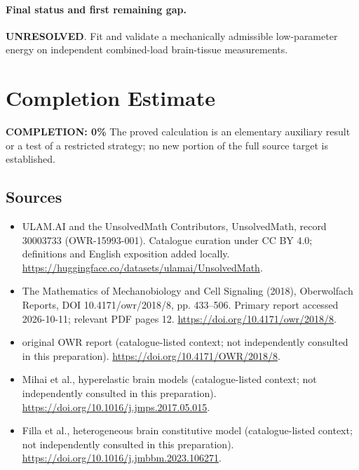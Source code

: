 \documentclass[11pt]{article}
\begin{document}
\paragraph{Final status and first remaining gap.}
\textbf{UNRESOLVED}. Fit and validate a mechanically admissible low-parameter energy on independent combined-load brain-tissue measurements.

\section{Completion Estimate}
\noindent\textbf{COMPLETION: 0\%}
The proved calculation is an elementary auxiliary result or a test of a restricted strategy; no new portion of the full source target is established.

\subsection{Sources}
\begin{itemize}
\item[\hypertarget{source:30003733:1}{S1}] ULAM.AI and the UnsolvedMath Contributors, UnsolvedMath, record 30003733 (OWR-15993-001). Catalogue curation under CC BY 4.0; definitions and English exposition added locally.
\url{https://huggingface.co/datasets/ulamai/UnsolvedMath}.
\item[\hypertarget{source:30003733:2}{S2}] The Mathematics of Mechanobiology and Cell Signaling (2018), Oberwolfach Reports, DOI 10.4171/owr/2018/8, pp. 433--506. Primary report accessed 2026-10-11; relevant PDF pages 12.
\url{https://doi.org/10.4171/owr/2018/8}.
\item[\hypertarget{source:30003733:3}{S3}] original OWR report (catalogue-listed context; not independently consulted in this preparation).
\url{https://doi.org/10.4171/OWR/2018/8}.
\item[\hypertarget{source:30003733:4}{S4}] Mihai et al., hyperelastic brain models (catalogue-listed context; not independently consulted in this preparation).
\url{https://doi.org/10.1016/j.jmps.2017.05.015}.
\item[\hypertarget{source:30003733:5}{S5}] Filla et al., heterogeneous brain constitutive model (catalogue-listed context; not independently consulted in this preparation).
\url{https://doi.org/10.1016/j.jmbbm.2023.106271}.
\end{itemize}
\label{end:30003733}
\end{document}
